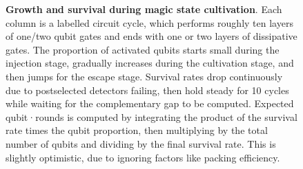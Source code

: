 \documentclass[onecolumn,unpublished,a4paper]{quantumarticle}
\theoremstyle{definition}
\begin{document}
\begin{figure}
    \centering
    \caption{
        \textbf{Growth and survival during magic state cultivation}.
        Each column is a labelled circuit cycle, which performs roughly ten layers of one/two qubit gates and ends with one or two layers of dissipative gates.
        The proportion of activated qubits starts small during the injection stage, gradually increases during the cultivation stage, and then jumps for the escape stage.
        Survival rates drop continuously due to postselected detectors failing, then hold steady for 10 cycles while waiting for the complementary gap to be computed.
        Expected qubit·rounds is computed by integrating the product of the survival rate times the qubit proportion, then multiplying by the total number of qubits and dividing by the final survival rate.
        This is slightly optimistic, due to ignoring factors like packing efficiency.
    }
    \label{fig:cultivation-lifetime}
\end{figure}
\end{document}
